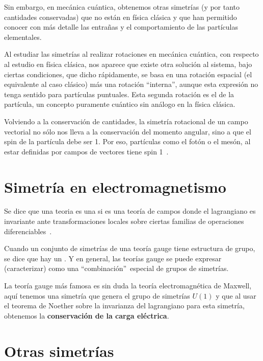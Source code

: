 Sin embargo, en mecánica cuántica, obtenemos otras simetrías (y por tanto cantidades conservadas) que no están en física clásica y que han permitido conocer con más detalle las entrañas y el comportamiento de las partículas elementales.

Al estudiar las simetrías al realizar rotaciones en mecánica cuántica, con respecto al estudio en física clásica, nos aparece que existe otra solución al sistema, bajo ciertas condiciones, que dicho rápidamente, se basa en una rotación espacial (el equivalente al caso clásico) más una rotación \textquotedblleft interna\textquotedblright, aunque esta expresión no tenga sentido para partículas puntuales. Esta segunda rotación es el  de la partícula, un concepto puramente cuántico sin análogo en la física clásica.

Volviendo a la conservación de cantidades, la simetría rotacional de un campo vectorial no sólo nos lleva a la conservación del momento angular, sino a que el spin de la partícula debe ser 1.
Por eso, partículas como el fotón o el mesón, al estar definidas por campos de vectores tiene spin 1~\cite{QMS}.

\section{Simetría en electromagnetismo}\label{sec:simetria-en-electromagnetismo}

Se dice que una teoria es una  si es una teoría de campos donde el lagrangiano es invariante ante transformaciones locales sobre ciertas familias de operaciones diferenciables~\cite{MAQFT}.

Cuando un conjunto de simetrías de una teoría gauge tiene estructura de grupo, se dice que hay un .
Y en general, las teorías gauge se puede expresar (caracterizar) como una \textquotedblleft combinación\textquotedblright\ especial de grupos de simetrías.

La teoría gauge más famosa es sin duda la teoría electromagnética de Maxwell, aquí tenemos una simetría que genera el grupo de simetrías $U(1)$ y que al usar el teorema de Noether sobre la invarianza del lagrangiano para esta simetría, obtenemos la \textbf{conservación de la carga eléctrica}.

\section{Otras simetrías}\label{sec:otras-simetrias}

